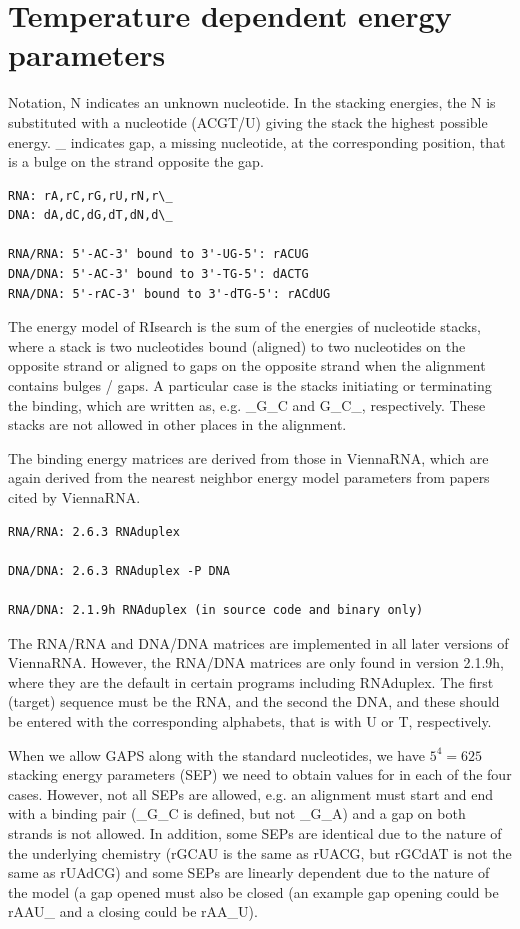 \section{Temperature dependent energy parameters}\label{temperature-dependent-energy-parameters}
Notation, N indicates an unknown nucleotide.
In the stacking energies, the N is substituted with a nucleotide (ACGT/U) giving the stack the highest possible energy. \_ indicates gap, a missing nucleotide, at the corresponding position, that is a bulge on the strand opposite the gap.
\begin{verbatim}
RNA: rA,rC,rG,rU,rN,r\_
DNA: dA,dC,dG,dT,dN,d\_

RNA/RNA: 5'-AC-3' bound to 3'-UG-5': rACUG
DNA/DNA: 5'-AC-3' bound to 3'-TG-5': dACTG
RNA/DNA: 5'-rAC-3' bound to 3'-dTG-5': rACdUG
\end{verbatim}

The energy model of RIsearch is the sum of the energies of nucleotide stacks, where a stack is two nucleotides bound (aligned) to two nucleotides on the opposite strand or aligned to gaps on the opposite strand when the alignment contains bulges / gaps.
A particular case is the stacks initiating or terminating the binding, which are written as, e.g. \_G\_C and G\_C\_, respectively.
These stacks are not allowed in other places in the alignment.

The binding energy matrices are derived from those in ViennaRNA\cite{ref4}, which are again derived from the nearest neighbor energy model parameters from papers\cite{ref5,ref6,ref7,ref8,ref9,ref10,ref11,ref12} cited by ViennaRNA.
\begin{verbatim}
RNA/RNA: 2.6.3 RNAduplex

DNA/DNA: 2.6.3 RNAduplex -P DNA

RNA/DNA: 2.1.9h RNAduplex (in source code and binary only)
\end{verbatim}

The RNA/RNA and DNA/DNA matrices are implemented in all later versions of ViennaRNA.
However, the RNA/DNA matrices are only found in version 2.1.9h, where they are the default in certain programs including RNAduplex.
The first (target) sequence must be the RNA, and the second the DNA, and these should be entered with the corresponding alphabets, that is with U or T, respectively.

When we allow GAPS along with the standard nucleotides, we have $5^4 = 625$ stacking energy parameters (SEP) we need to obtain values for in each of the four cases.
However, not all SEPs are allowed, e.g. an alignment must start and end with a binding pair (\_G\_C is defined, but not \_G\_A) and a gap on both strands is not allowed.
In addition, some SEPs are identical due to the nature of the underlying chemistry (rGCAU is the same as rUACG, but rGCdAT is not the same as rUAdCG) and some SEPs are linearly dependent due to the nature of the model (a gap opened must also be closed (an example gap opening could be rAAU\_ and a closing could be rAA\_U).

